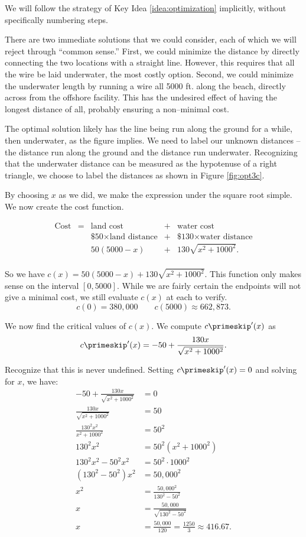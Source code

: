 {We will follow the strategy of Key Idea \ref{idea:optimization} implicitly, without specifically numbering steps.

There are two immediate solutions that we could consider, each of which we will reject through ``common sense.'' First, we could minimize the distance by directly connecting the two locations with a straight line. However, this requires that all the wire be laid underwater, the most costly option. Second, we could minimize the underwater length by running a wire all 5000 ft. along the beach, directly across from the offshore facility. This has the undesired effect of having the longest distance of all, probably ensuring a non--minimal cost.

The optimal solution likely has the line being run along the ground for a while, then underwater, as the figure implies. We need to label our unknown distances -- the distance run along the ground and the distance run underwater. Recognizing that the underwater distance can be measured as the hypotenuse of a right triangle, we choose to label the distances as shown in Figure \ref{fig:opt3c}.


By choosing $x$ as we did, we make the expression under the square root simple. We now create the cost function. 

$$
\begin{array}{ccccc}
\text{Cost} &=&  \text{land cost} &+ & \text{water cost} \\
						&	& \text{\$50}\times \text{land distance} &+& \text{\$130}\times \text{water distance} \\
						&	& 50(5000-x) &+& 130\sqrt{x^2+1000^2}.\\
\end{array}
$$

So we have $c(x) = 50(5000-x)+ 130\sqrt{x^2+1000^2}$. This function only makes sense on the interval $[0,5000]$. While we are fairly certain the endpoints will not give a minimal cost, we still evaluate $c(x)$ at each to verify.
$$c(0) = 380,000 \quad\quad c(5000) \approx 662,873.$$

We now find the critical values of $c(x)$. We compute $c\primeskip'(x)$ as 
$$c\primeskip'(x) = -50+\frac{130x}{\sqrt{x^2+1000^2}}.$$

Recognize that this is never undefined. Setting $c\primeskip'(x)=0$ and solving for $x$, we have:
\begin{align*}
-50+\frac{130x}{\sqrt{x^2+1000^2}} &= 0 \\
\frac{130x}{\sqrt{x^2+1000^2}}  &= 50\\
\frac{130^2x^2}{x^2+1000^2} &= 50^2\\
130^2x^2 &= 50^2(x^2+1000^2) \\
130^2x^2-50^2x^2 &= 50^2\cdot1000^2\\
(130^2-50^2)x^2 &= 50,000^2\\
x^2 &= \frac{50,000^2}{130^2-50^2}\\
x &= \frac{50,000}{\sqrt{130^2-50^2}}\\
x & = \frac{50,000}{120} =\frac{1250}3\approx 416.67.
\end{align*}

}
